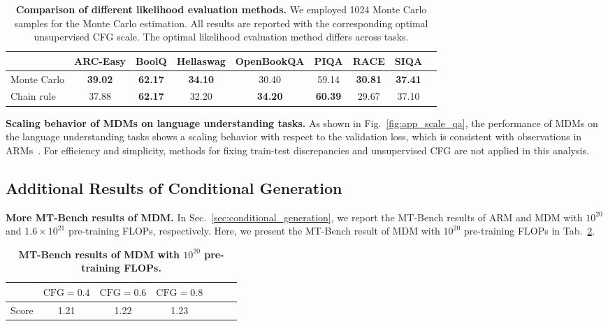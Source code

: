 \documentclass{article} %
\begin{document}
\begin{table}[t!]
    \centering
    \caption{\textbf{Comparison of different likelihood evaluation methods.} We employed 1024 Monte Carlo samples for the Monte Carlo estimation. All results are reported with the corresponding optimal unsupervised CFG scale. The optimal likelihood evaluation method differs across tasks. }
    \label{tab:app_likelihood_eval}
    \begin{adjustbox}{max width=\textwidth}
    \begin{tabular}{lcccccccc}
      \toprule
         & ARC-Easy & BoolQ & Hellaswag &  OpenBookQA &  PIQA & RACE & SIQA \\
        \midrule
        Monte Carlo  & \textbf{39.02} & \textbf{62.17} & \textbf{34.10} &30.40 & 59.14 &\textbf{30.81} & \textbf{37.41}\\
        \midrule
        Chain rule & 37.88 & \textbf{62.17} & 32.20 & \textbf{34.20} & \textbf{60.39} & 29.67 & 37.10\\
      \bottomrule
    \end{tabular}
    \end{adjustbox}
\end{table}


\textbf{Scaling behavior of MDMs on language understanding tasks.} As shown in Fig.~\ref{fig:app_scale_qa}, the performance of MDMs on the language understanding tasks shows a scaling behavior with respect to the validation loss, which is consistent with observations in ARMs~\citep{du2024understanding}. For efficiency and simplicity, methods for fixing train-test discrepancies and unsupervised CFG are not applied in this analysis.

\subsection{Additional Results of Conditional Generation}
\label{app:sec_results_condition}
\textbf{More MT-Bench results of MDM.} In Sec.~\ref{sec:conditional_generation}, we report the MT-Bench results of ARM and MDM with $10^{20}$ and $1.6 \times 10^{21}$ pre-training FLOPs, respectively. Here, we present the MT-Bench result of MDM with $10^{20}$ pre-training FLOPs in Tab.~\ref{tab:app_mt_bench_equal_flops}.

\begin{table}[t!]
    \centering
    \caption{\textbf{MT-Bench results of MDM with $10^{20}$ pre-training FLOPs.}}
    \label{tab:app_mt_bench_equal_flops}
    \begin{adjustbox}{max width=\textwidth}
    \begin{tabular}{lcccccc}
        \toprule
         & $\text{CFG}=0.4$ & $\text{CFG}=0.6$ & $\text{CFG}=0.8$ \\
         \midrule
         Score  & 1.21 & 1.22 & 1.23\\
         \bottomrule
    \end{tabular}
    \end{adjustbox}
\end{table}
\end{document}
